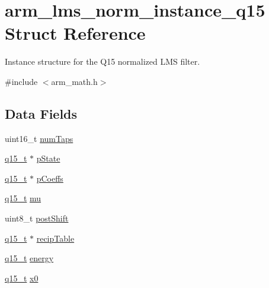 \hypertarget{structarm__lms__norm__instance__q15}{}\section{arm\+\_\+lms\+\_\+norm\+\_\+instance\+\_\+q15 Struct Reference}
\label{structarm__lms__norm__instance__q15}


Instance structure for the Q15 normalized L\+MS filter.  




{\ttfamily \#include $<$arm\+\_\+math.\+h$>$}

\subsection*{Data Fields}
\begin{DoxyCompactItemize}
\item 
uint16\+\_\+t \mbox{\hyperlink{structarm__lms__norm__instance__q15_a751941891e47f522a7f5375fe8990aac}{num\+Taps}}
\item 
\mbox{\hyperlink{arm__math_8h_ab5a8fb21a5b3b983d5f54f31614052ea}{q15\+\_\+t}} $\ast$ \mbox{\hyperlink{structarm__lms__norm__instance__q15_ae29dfdb736374fcddaeaec4b7770170c}{p\+State}}
\item 
\mbox{\hyperlink{arm__math_8h_ab5a8fb21a5b3b983d5f54f31614052ea}{q15\+\_\+t}} $\ast$ \mbox{\hyperlink{structarm__lms__norm__instance__q15_a7ca181a37f714d174445f486bebce26f}{p\+Coeffs}}
\item 
\mbox{\hyperlink{arm__math_8h_ab5a8fb21a5b3b983d5f54f31614052ea}{q15\+\_\+t}} \mbox{\hyperlink{structarm__lms__norm__instance__q15_aab4745770bd667de040227eec1b5ff8d}{mu}}
\item 
uint8\+\_\+t \mbox{\hyperlink{structarm__lms__norm__instance__q15_a74050e9f36542bd56f4052381a82ae8f}{post\+Shift}}
\item 
\mbox{\hyperlink{arm__math_8h_ab5a8fb21a5b3b983d5f54f31614052ea}{q15\+\_\+t}} $\ast$ \mbox{\hyperlink{structarm__lms__norm__instance__q15_a39b65b32f68643831304cece01e093bd}{recip\+Table}}
\item 
\mbox{\hyperlink{arm__math_8h_ab5a8fb21a5b3b983d5f54f31614052ea}{q15\+\_\+t}} \mbox{\hyperlink{structarm__lms__norm__instance__q15_ae7a8ccabc82348f6742ca7a2b3da2a41}{energy}}
\item 
\mbox{\hyperlink{arm__math_8h_ab5a8fb21a5b3b983d5f54f31614052ea}{q15\+\_\+t}} \mbox{\hyperlink{structarm__lms__norm__instance__q15_a3c975fed200b19723a2ed11efccca6cd}{x0}}
\end{DoxyCompactItemize}


